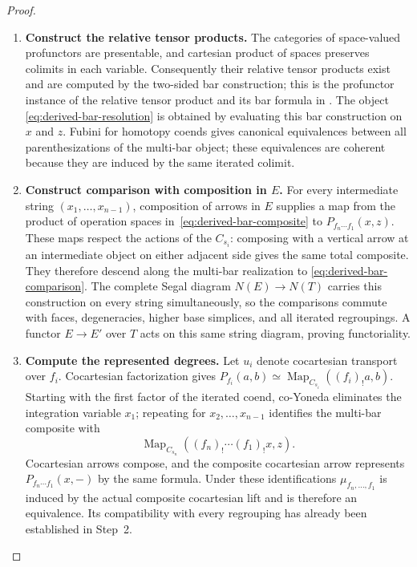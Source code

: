 \documentclass[oneside]{article}
\theoremstyle{plain}
\theoremstyle{definition}
\theoremstyle{remark}
\newcommand{\Map}{\operatorname{Map}}
\begin{document}
\begin{proof}
\leavevmode
\begin{enumerate}
\item \textbf{Construct the relative tensor products.}
The categories of space-valued profunctors are presentable, and
cartesian product of spaces preserves colimits in each variable.
Consequently their relative tensor products exist and are computed by
the two-sided bar construction; this is the profunctor instance of
the relative tensor product and its bar formula in
\cite[\S4.4.2--4.4.3]{LurieHA}. The object
\eqref{eq:derived-bar-resolution} is obtained by evaluating this
bar construction on $x$ and $z$. Fubini for homotopy coends gives
canonical equivalences between all parenthesizations of the
multi-bar object; these equivalences are coherent because they are
induced by the same iterated colimit.
\item \textbf{Construct comparison with composition in $E$.}
For every intermediate string $(x_1,\ldots,x_{n-1})$,
composition of arrows in $E$ supplies a map from the product
of operation spaces in~\eqref{eq:derived-bar-composite}
to $P_{f_n\cdots f_1}(x,z)$. These maps respect the actions of
the $C_{s_i}$: composing with a vertical arrow at an intermediate
object on either adjacent side gives the same total composite.
They therefore descend along the multi-bar realization to
\eqref{eq:derived-bar-comparison}. The complete Segal diagram
$N(E)\to N(T)$ carries this construction on every string
simultaneously, so the comparisons commute with faces,
degeneracies, higher base simplices, and all iterated regroupings.
A functor $E\to E'$ over $T$ acts on this same string diagram,
proving functoriality.
\item \textbf{Compute the represented degrees.}
Let $u_i$ denote cocartesian transport over $f_i$. Cocartesian
factorization gives
$P_{f_i}(a,b)\simeq\Map_{C_{s_i}}((f_i)_!a,b)$.
Starting with the first factor of the iterated coend, co-Yoneda
eliminates the integration variable $x_1$; repeating for
$x_2,\ldots,x_{n-1}$ identifies the multi-bar composite with
\[
 \Map_{C_{s_n}}
  ((f_n)_!\cdots(f_1)_!x,z).
\]
Cocartesian arrows compose, and the composite cocartesian arrow
represents $P_{f_n\cdots f_1}(x,-)$ by the same formula.
Under these identifications $\mu_{f_n,\ldots,f_1}$ is induced by
the actual composite cocartesian lift and is therefore an
equivalence. Its compatibility with every regrouping has already
been established in Step~2.\qedhere
\end{enumerate}
\end{proof}
\end{document}
